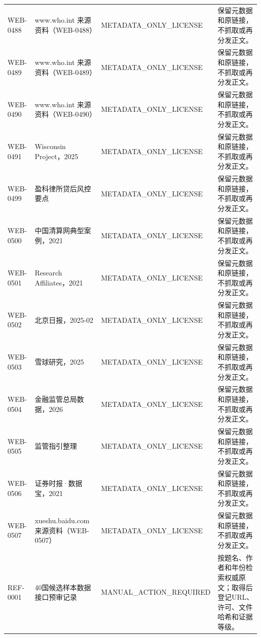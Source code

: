 \documentclass[UTF8,openany,oneside,11pt]{ctexbook}
\begin{document}
\begin{longtable}{L{1.5cm}L{5.5cm}L{3cm}L{5cm}}
WEB-\allowbreak{}0488 & www.who.int 来源资料（WEB-\allowbreak{}0488） & METADATA\_\allowbreak{}ONLY\_\allowbreak{}LICENSE & 保留元数据和原链接，不抓取或再分发正文。 \\
WEB-\allowbreak{}0489 & www.who.int 来源资料（WEB-\allowbreak{}0489） & METADATA\_\allowbreak{}ONLY\_\allowbreak{}LICENSE & 保留元数据和原链接，不抓取或再分发正文。 \\
WEB-\allowbreak{}0490 & www.who.int 来源资料（WEB-\allowbreak{}0490） & METADATA\_\allowbreak{}ONLY\_\allowbreak{}LICENSE & 保留元数据和原链接，不抓取或再分发正文。 \\
WEB-\allowbreak{}0491 & Wisconsin Project，2025 & METADATA\_\allowbreak{}ONLY\_\allowbreak{}LICENSE & 保留元数据和原链接，不抓取或再分发正文。 \\
WEB-\allowbreak{}0499 & 盈科律所贷后风控要点 & METADATA\_\allowbreak{}ONLY\_\allowbreak{}LICENSE & 保留元数据和原链接，不抓取或再分发正文。 \\
WEB-\allowbreak{}0500 & 中国清算网典型案例，2021 & METADATA\_\allowbreak{}ONLY\_\allowbreak{}LICENSE & 保留元数据和原链接，不抓取或再分发正文。 \\
WEB-\allowbreak{}0501 & Research Affiliates，2021 & METADATA\_\allowbreak{}ONLY\_\allowbreak{}LICENSE & 保留元数据和原链接，不抓取或再分发正文。 \\
WEB-\allowbreak{}0502 & 北京日报，2025-\allowbreak{}02 & METADATA\_\allowbreak{}ONLY\_\allowbreak{}LICENSE & 保留元数据和原链接，不抓取或再分发正文。 \\
WEB-\allowbreak{}0503 & 雪球研究，2025 & METADATA\_\allowbreak{}ONLY\_\allowbreak{}LICENSE & 保留元数据和原链接，不抓取或再分发正文。 \\
WEB-\allowbreak{}0504 & 金融监管总局数据，2026 & METADATA\_\allowbreak{}ONLY\_\allowbreak{}LICENSE & 保留元数据和原链接，不抓取或再分发正文。 \\
WEB-\allowbreak{}0505 & 监管指引整理 & METADATA\_\allowbreak{}ONLY\_\allowbreak{}LICENSE & 保留元数据和原链接，不抓取或再分发正文。 \\
WEB-\allowbreak{}0506 & 证券时报·数据宝，2021 & METADATA\_\allowbreak{}ONLY\_\allowbreak{}LICENSE & 保留元数据和原链接，不抓取或再分发正文。 \\
WEB-\allowbreak{}0507 & xueshu.baidu.com 来源资料（WEB-\allowbreak{}0507） & METADATA\_\allowbreak{}ONLY\_\allowbreak{}LICENSE & 保留元数据和原链接，不抓取或再分发正文。 \\
REF-\allowbreak{}0001 & 40国候选样本数据接口预审记录 & MANUAL\_\allowbreak{}ACTION\_\allowbreak{}REQUIRED & 按题名、作者和年份检索权威原文；取得后登记URL、许可、文件哈希和证据等级。 \\
\bottomrule\end{longtable}\normalsize
\end{document}

